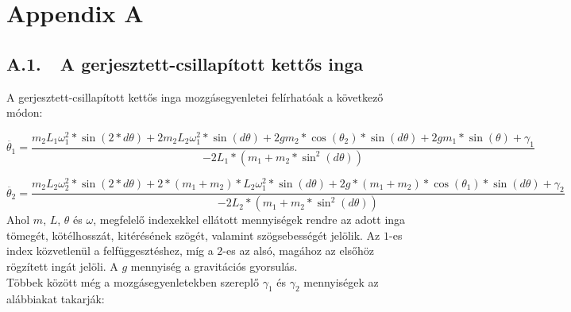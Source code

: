 \section*{Appendix A}

\subsection*{A.1.\ \ A gerjesztett-csillapított kettős inga}

A gerjesztett-csillapított kettős inga mozgásegyenletei felírhatóak a következő\cite{double} módon:

\begin{equation}
    \ddot{\theta_{1}}
    =
    {
    \frac{m_{2} L_{1} \omega_{1}^{2} * \sin{\left( 2 * d \theta \right)}
    +
    2 m_{2} L_{2} \omega_{1}^{2} * \sin{\left( d \theta \right)}
    +
    2 g m_{2} * \cos{\left( \theta_{2} \right)} * \sin{\left( d \theta \right)}
    +
    2 g m_{1} * \sin{\left( \theta \right)}
    +
    \gamma_{1}
    }{
    -2 L_{1} * \left( m_1 + m_2 * \sin^{2}{\left( d \theta \right)} \right)
    }
    }
\end{equation}

\begin{equation}
    \ddot{\theta_{2}}
    =
    {
    \frac{m_{2} L_{2} \omega_{2}^{2} * \sin{\left( 2 * d \theta \right)}
    +
    2 * \left( m_{1} + m_{2} \right) * L_{2} \omega_{1}^{2} * \sin{\left( d \theta \right)}
    +
    2 g * \left( m_{1} + m_{2} \right) * \cos{\left( \theta_{1} \right)} * \sin{\left( d \theta \right)}
    +
    \gamma_{2}
    }{
    -2 L_{2} * \left( m_1 + m_2 * \sin^{2}{\left( d \theta \right)} \right)
    }
    }
\end{equation}
Ahol $m$, $L$, $\theta$ és $\omega$, megfelelő indexekkel ellátott mennyiségek rendre az adott inga tömegét, kötélhosszát, kitérésének szögét, valamint szögsebességét jelölik. Az $1$-es index közvetlenül a felfüggesztéshez, míg a $2$-es az alsó, magához az elsőhöz rögzített ingát jelöli. A $g$ mennyiség a gravitációs gyorsulás. \\
Többek között még a mozgásegyenletekben szereplő $\gamma_{1}$ és $\gamma_{2}$ mennyiségek az alábbiakat takarják:

